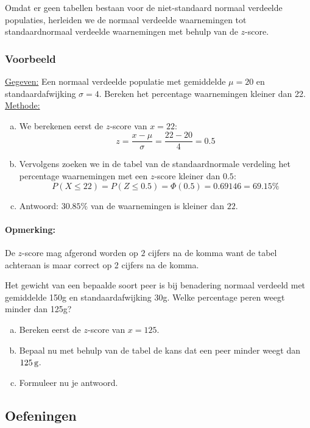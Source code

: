 \documentclass[12pt,twoside,a4paper]{article}
\begin{document}
Omdat er geen tabellen bestaan voor de niet-standaard normaal verdeelde populaties, herleiden we de normaal verdeelde waarnemingen tot standaardnormaal verdeelde waarnemingen met behulp van de $z$-score.

\subsubsection*{Voorbeeld}

\underline{Gegeven:} Een normaal verdeelde populatie met gemiddelde $\mu=20$ en standaardafwijking $\sigma=4$. Bereken het percentage waarnemingen kleiner dan 22.\\
\underline{Methode:}
\begin{enumerate}[(a)]
  \item We berekenen eerst de $z$-score van $x=22$:
  $$z=\dfrac{x-\mu}{\sigma}=\dfrac{22-20}{4}=0.5$$
  \item Vervolgens zoeken we in de tabel van de standaardnormale verdeling het percentage waarnemingen met een $z$-score kleiner dan $0.5$:
  $$P(X\leq 22)=P(Z\leq 0.5)=\Phi(0.5)=0.69146=69.15\%$$
  \item Antwoord: $30.85\%$ van de waarnemingen is kleiner dan $22$.
\end{enumerate}

\paragraph*{Opmerking: } De $z$-score mag afgerond worden op $2$ cijfers na de komma want de tabel achteraan is maar correct op 2 cijfers na de komma.

\begin{oefening}
Het gewicht van een bepaalde soort peer is bij benadering normaal verdeeld met gemiddelde 150g en standaardafwijking 30g.
Welke percentage peren weegt minder dan 125g?
\begin{enumerate}[(a)]
  \item Bereken eerst de $z$-score van $x=125$.
  \item Bepaal nu met behulp van de tabel de kans dat een peer minder weegt dan $125\g$.
  \item Formuleer nu je antwoord.
\end{enumerate}
\end{oefening}

\subsection{Oefeningen}
\end{document}
